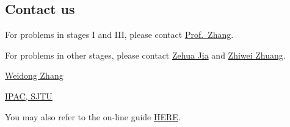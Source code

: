 \documentclass[]{article}
\begin{document}
\hypertarget{contact-us}{%
\subsection{Contact us}\label{contact-us}}

For problems in stages I and III, please contact
\href{mailto:wdzhang@sjtu.edu.cn}{Prof.~Zhang}.

For problems in other stages, please contact
\href{mailto:598053117@qq.com}{Zehua Jia} and
\href{mailto:zzw1993@sjtu.edu.cn}{Zhiwei Zhuang}.

\href{mailto:wdzhang@sjtu.edu.cn}{Weidong Zhang}

\href{http://automation.sjtu.edu.cn/ipac}{IPAC, SJTU}

You may also refer to the on-line guide
\href{https://github.com/kouyx/ipac-postdoc-guide/blob/master/README.md}{HERE}.
\end{document}
